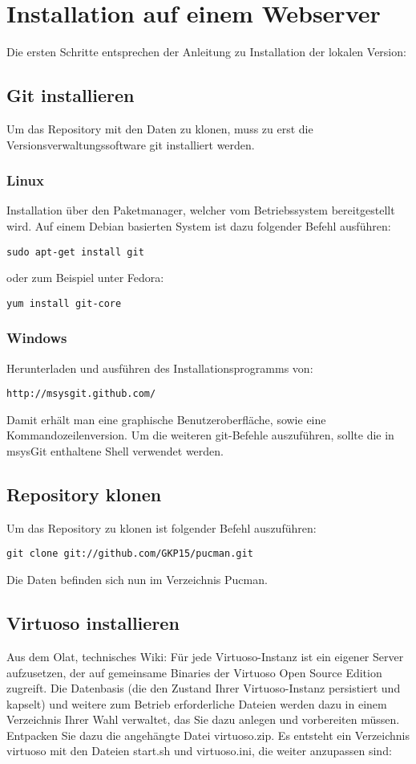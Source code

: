 \documentclass[11pt,a4paper]{article}
\begin{document}
\section{Installation auf einem Webserver}
Die ersten Schritte entsprechen der Anleitung zu Installation der lokalen Version:
\subsection{Git installieren}
Um das Repository mit den Daten zu klonen, muss zu erst die Versionsverwaltungssoftware git installiert werden.
\subsubsection{Linux}
Installation über den Paketmanager, welcher vom Betriebssystem bereitgestellt wird.
Auf einem Debian basierten System ist dazu folgender Befehl ausführen:
\begin{lstlisting}
sudo apt-get install git
\end{lstlisting}
oder zum Beispiel unter Fedora:
\begin{lstlisting}
yum install git-core
\end{lstlisting}
\subsubsection{Windows}
Herunterladen und ausführen des Installationsprogramms von:
\begin{lstlisting}
http://msysgit.github.com/
\end{lstlisting}
Damit erhält man eine graphische Benutzeroberfläche, sowie eine Kommandozeilenversion.
Um die weiteren git-Befehle auszuführen, sollte die in msysGit enthaltene Shell verwendet werden.
\subsection{Repository klonen}
Um das Repository zu klonen ist folgender Befehl auszuführen:
\begin{lstlisting}
git clone git://github.com/GKP15/pucman.git
\end{lstlisting}
Die Daten befinden sich nun im Verzeichnis Pucman.
\subsection{Virtuoso installieren}
Aus dem Olat, technisches Wiki:
Für jede Virtuoso-Instanz ist ein eigener Server aufzusetzen, der auf gemeinsame Binaries der Virtuoso Open Source Edition zugreift. Die Datenbasis (die den Zustand Ihrer Virtuoso-Instanz persistiert und kapselt) und weitere zum Betrieb erforderliche Dateien werden dazu in einem Verzeichnis Ihrer Wahl verwaltet, das Sie dazu anlegen und vorbereiten müssen.
Entpacken Sie dazu die angehängte Datei virtuoso.zip. Es entsteht ein Verzeichnis virtuoso mit den Dateien start.sh und virtuoso.ini, die weiter anzupassen sind:
\end{document}
